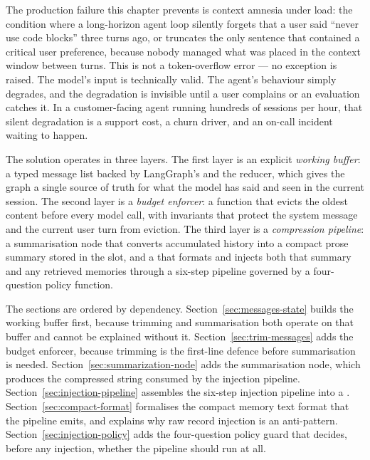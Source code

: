

The production failure this chapter prevents is context amnesia under
load: the condition where a long-horizon agent loop silently forgets
that a user said ``never use code blocks'' three turns ago, or truncates
the only sentence that contained a critical user preference, because
nobody managed what was placed in the context window between turns.
This is not a token-overflow error --- no exception is raised. The
model's input is technically valid. The agent's behaviour simply
degrades, and the degradation is invisible until a user complains or an
evaluation catches it. In a customer-facing agent running hundreds of
sessions per hour, that silent degradation is a support cost, a churn
driver, and an on-call incident waiting to happen.

The solution operates in three layers. The first layer is an explicit
\emph{working buffer}: a typed message list backed by LangGraph's
 and the  reducer, which gives
the graph a single source of truth for what the model has said and seen
in the current session. The second layer is a \emph{budget enforcer}:
a  function that evicts the oldest content before
every model call, with invariants that protect the system message and
the current user turn from eviction. The third layer is a
\emph{compression pipeline}: a summarisation node that converts
accumulated history into a compact prose summary stored in the
 slot, and a  that formats and
injects both that summary and any retrieved memories through a six-step
pipeline governed by a four-question policy function.

The sections are ordered by dependency. Section~\ref{sec:messages-state}
builds the working buffer first, because trimming and summarisation both
operate on that buffer and cannot be explained without it.
Section~\ref{sec:trim-messages} adds the budget enforcer, because
trimming is the first-line defence before summarisation is needed.
Section~\ref{sec:summarization-node} adds the summarisation node, which
produces the compressed  string consumed by the injection
pipeline. Section~\ref{sec:injection-pipeline} assembles the six-step
injection pipeline into a .
Section~\ref{sec:compact-format} formalises the compact memory text
format that the pipeline emits, and explains why raw record injection is
an anti-pattern. Section~\ref{sec:injection-policy} adds the
four-question policy guard that decides, before any injection, whether
the pipeline should run at all.

